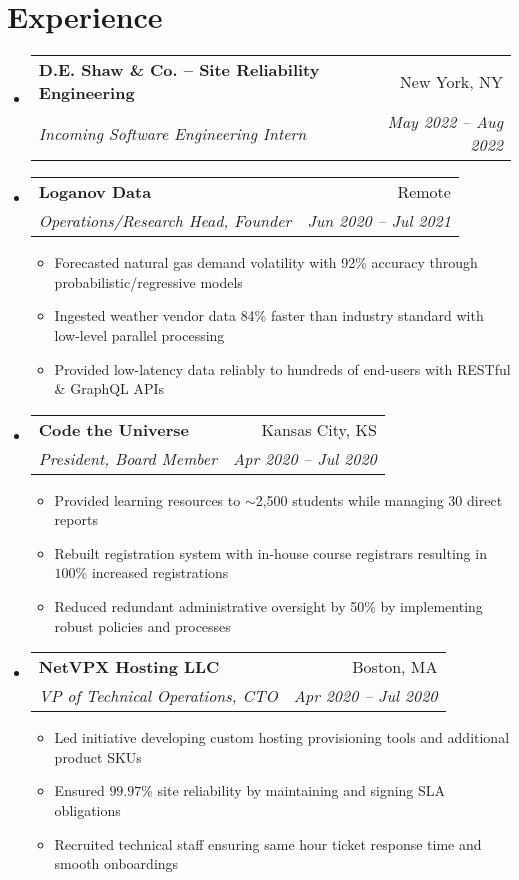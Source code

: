 \documentclass[a4paper,11pt]{extarticle}
\makeatletter
\newcommand{\resumeItem}[1]{
	\item\small{
		#1 \vspace{-2pt}
	}
}
\newcommand{\resumeSubheading}[4]{
	\vspace{-1pt}\item
		\begin{tabular*}{1\linewidth}{l@{\extracolsep{\fill}}r}
			\textbf{#1} & #2 \\
			\textit{#3} & \textit{#4} \\
		\end{tabular*}\vspace{-3pt}
}
\newcommand{\resumeSubHeadingListStart}{\begin{itemize}[leftmargin=0.15in,label={}]}
\newcommand{\resumeSubHeadingListEnd}{\end{itemize}}
\newcommand{\resumeItemListStart}{\begin{itemize}\vspace{-3pt}}
\newcommand{\resumeItemListEnd}{\end{itemize}\vspace{-3pt}}
\makeatother
\begin{document}
\section{Experience}
	\resumeSubHeadingListStart
        \resumeSubheading
            {D.E. Shaw \& Co. -- Site Reliability Engineering}
            {New York, NY}
            {Incoming Software Engineering Intern}
            {May 2022 -- Aug 2022}
        \vspace{-1mm}
		\resumeSubheading
            {Loganov Data}
            {Remote}
		    {Operations/Research Head, Founder}
            {Jun 2020 -- Jul 2021}
		\resumeItemListStart
			\resumeItem{Forecasted natural gas demand volatility with 92\%
				accuracy through probabilistic/regressive models}
			\resumeItem{Ingested weather vendor data 84\% faster than industry
				standard with low-level parallel processing}
			\resumeItem{Provided low-latency data reliably to hundreds of
				end-users with RESTful \& GraphQL APIs}
		\resumeItemListEnd
		\resumeSubheading
            {Code the Universe}
            {Kansas City, KS}
		    {President, Board Member}
            {Apr 2020 -- Jul 2020}
		\resumeItemListStart
			\resumeItem{Provided learning resources to $\sim$2,500
				students while managing 30 direct reports}
			\resumeItem{Rebuilt registration system with in-house course
				registrars resulting in $100$\% increased registrations}
			\resumeItem{Reduced redundant administrative oversight by 50\% by
				implementing robust policies and processes}
		\resumeItemListEnd
		\resumeSubheading
            {NetVPX Hosting LLC}
            {Boston, MA}
		    {VP of Technical Operations, CTO}
            {Apr 2020 -- Jul 2020}
		\resumeItemListStart
			\resumeItem{Led initiative developing custom hosting provisioning
				tools and additional product SKUs}
			\resumeItem{Ensured $99.97$\% site reliability by maintaining
				and signing SLA obligations}
			\resumeItem{Recruited technical staff ensuring same hour ticket
				response time and smooth onboardings}
		\resumeItemListEnd
	\resumeSubHeadingListEnd
\end{document}
